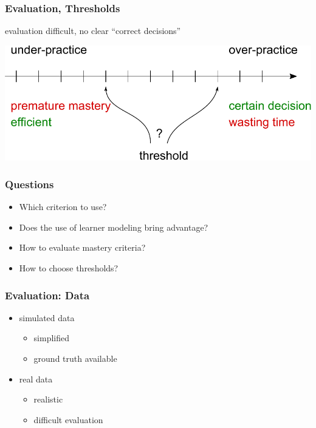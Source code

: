 \documentclass[bigger]{beamer}
\begin{document}
\begin{frame}
  \frametitle{Evaluation, Thresholds}

  evaluation difficult, no clear ``correct decisions''

  \bigskip

  \begin{center}
    \includegraphics[width=\linewidth]{tradeoff}
  \end{center}

\end{frame}

\begin{frame}
  \frametitle{Questions}

  \begin{itemize}
  \item Which criterion to use?
  \item Does the use of learner modeling bring advantage?
  \item How to evaluate mastery criteria?
  \item How to choose thresholds?
  \end{itemize}
\end{frame}

\begin{frame}
  \frametitle{Evaluation: Data}

  \begin{itemize}
  \item simulated data
    \begin{itemize}
    \item simplified
    \item ground truth available
    \end{itemize}
  \item real data
    \begin{itemize}
    \item realistic
    \item difficult evaluation
    \end{itemize}
  \end{itemize}
\end{frame}
\end{document}
